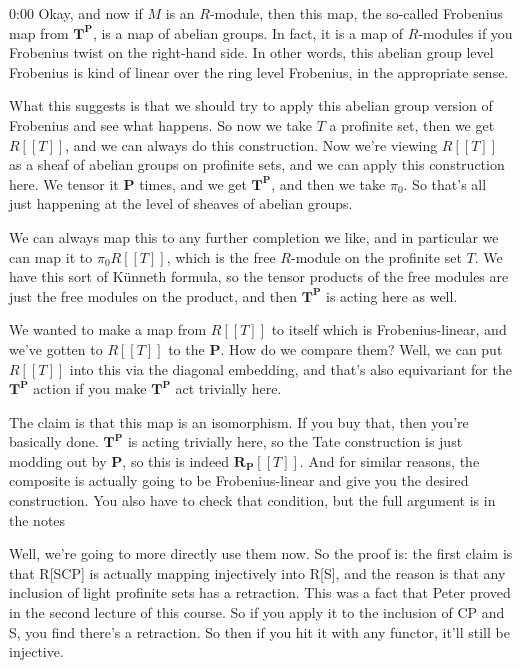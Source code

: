 \begin{unfinished}{0:00}
Okay, and now if $M$ is an $R$-module, then this map, the so-called Frobenius map from $\mathbf{T}^\mathbf{P}$, is a map of abelian groups. In fact, it is a map of $R$-modules if you Frobenius twist on the right-hand side. In other words, this abelian group level Frobenius is kind of linear over the ring level Frobenius, in the appropriate sense.

What this suggests is that we should try to apply this abelian group version of Frobenius and see what happens. So now we take $T$ a profinite set, then we get $R[[T]]$, and we can always do this construction. Now we're viewing $R[[T]]$ as a sheaf of abelian groups on profinite sets, and we can apply this construction here. We tensor it $\mathbf{P}$ times, and we get $\mathbf{T}^\mathbf{P}$, and then we take $\pi_0$. So that's all just happening at the level of sheaves of abelian groups.

We can always map this to any further completion we like, and in particular we can map it to $\pi_0 R[[T]]$, which is the free $R$-module on the profinite set $T$. We have this sort of Künneth formula, so the tensor products of the free modules are just the free modules on the product, and then $\mathbf{T}^\mathbf{P}$ is acting here as well.

We wanted to make a map from $R[[T]]$ to itself which is Frobenius-linear, and we've gotten to $R[[T]]$ to the $\mathbf{P}$. How do we compare them? Well, we can put $R[[T]]$ into this via the diagonal embedding, and that's also equivariant for the $\mathbf{T}^\mathbf{P}$ action if you make $\mathbf{T}^\mathbf{P}$ act trivially here.

The claim is that this map is an isomorphism. If you buy that, then you're basically done. $\mathbf{T}^\mathbf{P}$ is acting trivially here, so the Tate construction is just modding out by $\mathbf{P}$, so this is indeed $\mathbf{R}_\mathbf{P}[[T]]$. And for similar reasons, the composite is actually going to be Frobenius-linear and give you the desired construction. You also have to check that condition, but the full argument is in the notes

Well, we're going to more directly use them now. So the proof is: the first claim is that R[SCP] is actually mapping injectively into R[S], and the reason is that any inclusion of light profinite sets has a retraction. This was a fact that Peter proved in the second lecture of this course. So if you apply it to the inclusion of CP and S, you find there's a retraction. So then if you hit it with any functor, it'll still be injective.


\end{unfinished}
